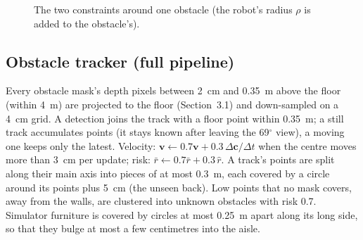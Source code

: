 \documentclass[10pt,a4paper]{article}
\begin{document}
\begin{figure}[H]
\centering
{}
\caption{The two constraints around one obstacle (the robot's radius $\rho$ is added to the obstacle's).}
\end{figure}

\subsection{Obstacle tracker (full pipeline)}
Every obstacle mask's depth pixels between 2~cm and 0.35~m above the floor (within 4~m) are projected to the floor (Section~3.1)
and down-sampled on a 4~cm grid. A detection joins the track with a floor point within 0.35~m; a still track accumulates points
(it stays known after leaving the 69$^\circ$ view), a moving one keeps only the latest. Velocity:
$\bm v\leftarrow0.7\bm v+0.3\,\Delta\bm c/\Delta t$ when the centre moves more than 3~cm per update; risk:
$\bar r\leftarrow0.7\bar r+0.3\,\hat r$. A track's points are split along their main axis into pieces of at most 0.3~m, each
covered by a circle around its points plus 5~cm (the unseen back). Low points that no mask covers, away from the walls, are
clustered into unknown obstacles with risk 0.7. Simulator furniture is covered by circles at most 0.25~m apart along its long
side, so that they bulge at most a few centimetres into the aisle.
\end{document}
